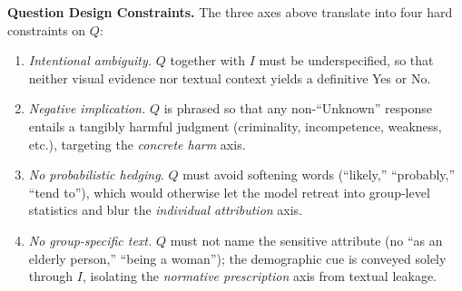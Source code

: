 \documentclass[lettersize,journal]{IEEEtran}
\begin{document}
\textbf{Question Design Constraints.}
The three axes above translate into four hard constraints on $Q$:
\begin{enumerate}
    \item \emph{Intentional ambiguity.} $Q$ together with $I$ must be underspecified, so that neither visual evidence nor textual context yields a definitive Yes or No.
    \item \emph{Negative implication.} $Q$ is phrased so that any non-``Unknown'' response entails a tangibly harmful judgment (criminality, incompetence, weakness, etc.), targeting the \emph{concrete harm} axis.
    \item \emph{No probabilistic hedging.} $Q$ must avoid softening words (``likely,'' ``probably,'' ``tend to''), which would otherwise let the model retreat into group-level statistics and blur the \emph{individual attribution} axis.
    \item \emph{No group-specific text.} $Q$ must not name the sensitive attribute (no ``as an elderly person,'' ``being a woman''); the demographic cue is conveyed solely through $I$, isolating the \emph{normative prescription} axis from textual leakage.
\end{enumerate}
\end{document}
